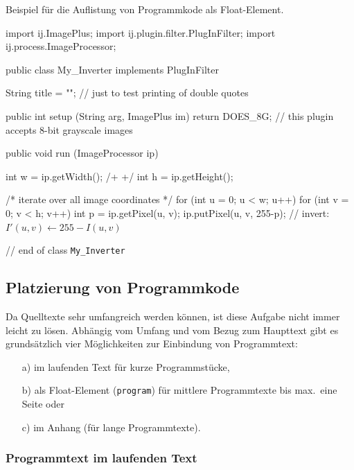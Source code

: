 \begin{program}
\caption{Beispiel für die Auflistung von Programmkode als Float-Element.}
\label{prog:CodeExample}
\begin{JavaCode}
import ij.ImagePlus;
import ij.plugin.filter.PlugInFilter;
import ij.process.ImageProcessor;

public class My_Inverter implements PlugInFilter {

  String title = ""; // just to test printing of double quotes

	public int setup (String arg, ImagePlus im) {
		return DOES_8G;	// this plugin accepts 8-bit grayscale images \label{pr:IjSamplePlugin10}
	}

	public void run (ImageProcessor ip) {
		int w = ip.getWidth();	/+ \label{ExampleCodeLabel} +/
		int h = ip.getHeight(); 
		
		/* iterate over all image coordinates */
		for (int u = 0; u < w; u++) { 
			for (int v = 0; v < h; v++) {
				int p = ip.getPixel(u, v); 
				ip.putPixel(u, v, 255-p); // invert: $I'(u,v) \leftarrow 255 - I(u,v)$\label{MathInCode}
			}
		}
	}
			
} // end of class {\tt My\_Inverter}
\end{JavaCode}
%
\end{program}


\subsection{Platzierung von Programmkode}

Da Quelltexte sehr umfangreich werden können, ist diese Aufgabe nicht
immer leicht zu lösen. Abhängig vom Umfang und vom Bezug zum Haupttext
gibt es grundsätzlich vier Möglichkeiten zur Einbindung von Programmtext:
%
\begin{itemize}
\item[a)] im laufenden Text für kurze Programmstücke,
\item[b)] als Float-Element (\texttt{program}) für mittlere Programmtexte bis max.\ eine Seite oder
\item[c)] im Anhang (für lange Programmtexte).
\end{itemize}

\subsubsection{Programmtext im laufenden Text}

